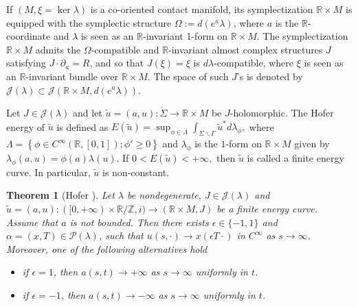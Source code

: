 \documentclass{amsart}
\newcommand{\R}{\mathbb{R}}
\newcommand{\Z}{\mathbb{Z}}
\newcommand{\J}{\mathcal{J}}
\renewcommand{\P}{\mathcal{P}}
\newtheorem{theorem}{Theorem}[section]
\begin{document}
If $(M,\xi=\ker \lambda)$ is a co-oriented contact manifold, its symplectization $\R \times M$ is equipped with the symplectic structure $\Omega:=d(e^a \lambda)$, where $a$ is the $\R$-coordinate and $\lambda$ is seen as an $\R$-invariant 1-form on $\R \times M$. The symplectization $\R \times M$ admits the $\Omega$-compatible and  $\R$-invariant almost complex structures $J$ satisfying
$J \cdot \partial_a = R$, and so that $J(\xi)=\xi$ is $d\lambda$-compatible,
where $\xi$ is seen as an $\R$-invariant bundle over $\R \times M$.
The space of such $J$'s is denoted by
$\mathcal{J}(\lambda) \subset \mathcal{J}(\R \times M, d(e^a \lambda))$.



Let $J\in \J(\lambda)$ and let $\tilde u=(a,u):\dot \Sigma \to \R \times M$ be  $J$-holomorphic.  The Hofer energy of $\widetilde{u}$ is defined as
$
E(\widetilde{u})=\sup_{\phi \in \Lambda} \int_{\Sigma \backslash \Gamma} \widetilde{u}^*d\lambda_{\phi},
$
where $\Lambda=\left\{\phi \in C^{\infty}\left(\R,[0,1]\right); \phi' \geq 0 \right\}$ and $\lambda_{\phi}$ is the $1$-form on $\R \times M$ given by
$\lambda_{\phi}(a,u)=\phi(a)\lambda(u).$ If
$
0<E(\tilde u) < +\infty,
$
then $\tilde u$ is called a finite energy curve. In particular, $\tilde u$ is non-constant.


\begin{theorem}[Hofer \cite{Hofer1993, prop1}]\label{teo:Hofer}
Let $\lambda$ be nondegenerate, $J\in \J(\lambda)$ and  $\widetilde{u}=(a,u):([0,+\infty) \times \R / \Z,i) \to (\R \times M,J)$ be a finite energy curve. Assume that $a$ is not bounded. Then there exists $\epsilon\in \{-1,1\}$  and $\alpha=(x,T) \in \P(\lambda)$, such that $u(s, \cdot) \to x(\epsilon T\cdot)$ in $C^\infty$ as $s \to \infty$. Moreover, one of the following alternatives hold
\begin{itemize}
    \item[(i)] if $\epsilon=1$, then $a(s,t) \to +\infty$ as $s \to \infty$ uniformly in $t$.
    \item[(ii)] if $\epsilon=-1$, then $a(s,t) \to -\infty$ as $s \to \infty$ uniformly in $t$.
\end{itemize}
\end{theorem}
\end{document}
